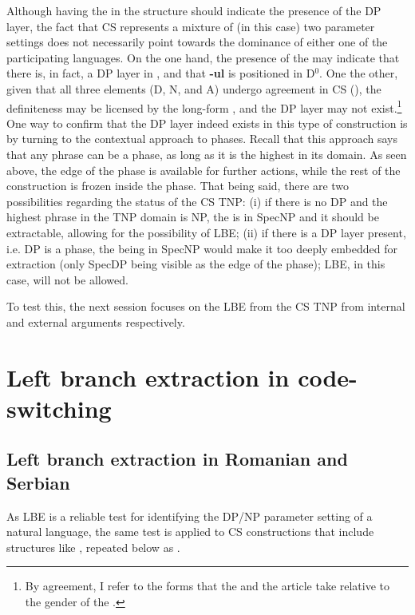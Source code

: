 \documentclass[output=paper,hidelinks,newtxmath,]{langscibook}
\begin{document}
Although having the  in the structure should indicate the presence of the DP layer, the fact that CS represents a mixture of (in this case) two parameter settings does not necessarily point towards the dominance of either one of the participating languages. On the one hand, the presence of the  may indicate that there is, in fact, a DP layer in , and that \textbf{-ul} is positioned in D$^0$. One the other, given that all three elements (D, N, and A) undergo agreement in CS (\citealt{Petroj}), the definiteness may be licensed by the  long-form , and the DP layer may not exist.\footnote{\label{15:fn8}By agreement, I refer to the forms that the  and the article take relative to the gender of the .} One way to confirm that the DP layer indeed exists in this type of construction is by turning to the contextual approach to phases. Recall that this approach says that any phrase can be a phase, as long as it is the highest in its domain. As seen above, the edge of the phase is available for further actions, while the rest of the construction is frozen inside the phase. That being said, there are two possibilities regarding the status of the CS TNP: (i) if there is no DP and the highest phrase in the TNP domain is NP, the  is in SpecNP and it should be extractable, allowing for the possibility of LBE; (ii) if there is a DP layer present, i.e. DP is a phase, the  being in SpecNP would make it too deeply embedded for extraction (only SpecDP being visible as the edge of the phase); LBE, in this case, will not be allowed.

To test this, the next session focuses on the LBE from the CS TNP from internal and external arguments respectively.\largerpage

\section{Left branch extraction in code-switching}\label{15:s5}
\subsection{Left branch extraction in Romanian and Serbian}\label{15:s5.1}

As LBE is a reliable test for identifying the DP/NP parameter setting of a natural language, the same test is applied to CS constructions that include structures like , repeated below as .
\end{document}
